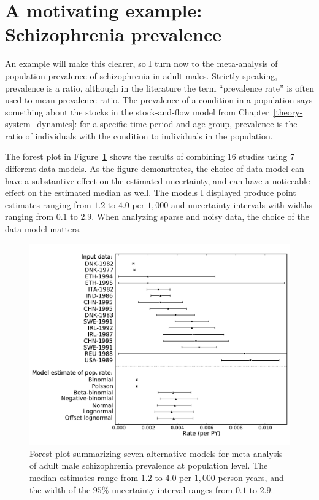 \section{A motivating example: Schizophrenia prevalence}
An example will make this clearer, so I turn now to the meta-analysis
of population prevalence of schizophrenia in adult males.  Strictly
speaking, prevalence is a ratio, although in the
literature the term ``prevalence rate'' is often used to mean
prevalence ratio.  The prevalence of a condition in a population says
something about the stocks in the stock-and-flow model from
Chapter~\ref{theory-system_dynamics}: for a specific time period and
age group, prevalence is the ratio of individuals with the condition
to individuals in the population.

The forest plot in Figure~\ref{rate-model-schiz-forest} shows the
results of combining $16$ studies using $7$ different data models.  As
the figure demonstrates, the choice of data model can have a
substantive effect on the estimated uncertainty, and can have a
noticeable effect on the estimated median as well. The models I
displayed produce point estimates ranging from $1.2$ to $4.0$ per
$1,000$ and uncertainty intervals with widths ranging from $0.1$ to
$2.9$.  When analyzing sparse and noisy data, the choice of the data model
matters.

\begin{figure}[h]
\begin{center}
\includegraphics[width=\textwidth]{schiz_forest.pdf}
\caption{Forest plot summarizing seven alternative models for
  meta-analysis of adult male schizophrenia prevalence at
  population level.  The median estimates range from
  $1.2$ to
  $4.0$ per $1,000$ person years, and the width of the
  $95\%$ uncertainty interval ranges from
  $0.1$ to
  $2.9$.}
\label{rate-model-schiz-forest}
\end{center}
\end{figure}

